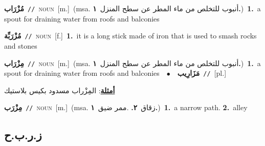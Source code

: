\documentclass[10pt,a4paper,twoside]{article} %
\begin{document}
\begin{multicols}{2}
{\setlength\topsep{0pt}\textbf{\foreignlanguage{arabic}{مُزْرَاب}}\ {\color{gray}\texttt{//}\color{black}}\ \textsc{noun}\ [m.]\ \color{gray}(msa. \foreignlanguage{arabic}{أنبوب للتخلص من ماء المطر عن سطح المنزل}~\foreignlanguage{arabic}{\textbf{١.}})\color{black}\ \textbf{1.}~a spout for draining water from roofs and balconies\ } \vspace{2mm}

{\setlength\topsep{0pt}\textbf{\foreignlanguage{arabic}{مُزْرَبِّة}}\ {\color{gray}\texttt{//}\color{black}}\ \textsc{noun}\ [f.]\ \textbf{1.}~it is a long stick made of iron that is used to smash rocks and stones\ } \vspace{2mm}

{\setlength\topsep{0pt}\textbf{\foreignlanguage{arabic}{مِزْرَاب}}\ {\color{gray}\texttt{//}\color{black}}\ \textsc{noun}\ [m.]\ \color{gray}(msa. \foreignlanguage{arabic}{أنبوب للتخلص من ماء المطر عن سطح المنزل}~\foreignlanguage{arabic}{\textbf{١.}})\color{black}\ \textbf{1.}~a spout for draining water from roofs and balconies\ \ $\bullet$\ \ \setlength\topsep{0pt}\textbf{\foreignlanguage{arabic}{مَزَارِيب}}\ {\color{gray}\texttt{//}\color{black}}\ [pl.]\  \begin{flushright}\color{gray}\foreignlanguage{arabic}{\textbf{\underline{\foreignlanguage{arabic}{أمثلة}}}: المِزْراب مسدود بكيس بلاستيك}\end{flushright}\color{black}} \vspace{2mm}

{\setlength\topsep{0pt}\textbf{\foreignlanguage{arabic}{مِزْرَب}}\ {\color{gray}\texttt{//}\color{black}}\ \textsc{noun}\ [m.]\ \color{gray}(msa. \foreignlanguage{arabic}{زقاق}~\foreignlanguage{arabic}{\textbf{٢.}}  .\foreignlanguage{arabic}{ممر ضيق}~\foreignlanguage{arabic}{\textbf{١.}})\color{black}\ \textbf{1.}~a narrow path.  \textbf{2.}~alley\ } \vspace{2mm}

\vspace{-3mm}
\subsection*{\color{blue}\foreignlanguage{arabic}{ز.ر.ب.ح}\color{blue}{ (ntws)}} 


\end{multicols}
\end{document}
